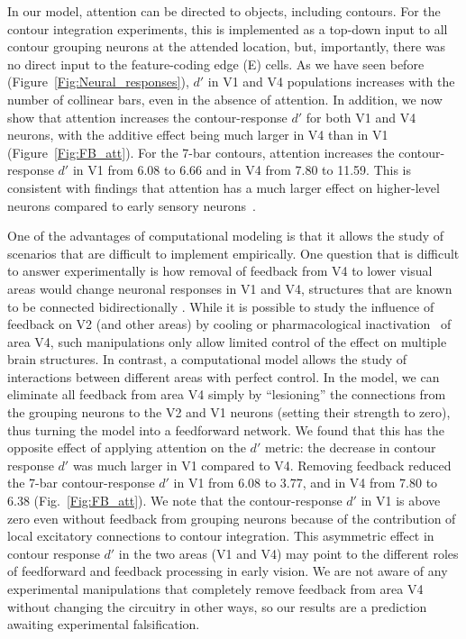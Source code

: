 In our model, attention can be directed to objects, including contours. For the contour integration experiments, this is implemented as a top-down input to all contour grouping neurons at the attended location, but, importantly, 
there was
%
no direct input to the feature-coding edge (E) cells. As we have seen before (Figure~\ref{Fig:Neural_responses}), $d'$ in V1 and V4 populations increases with the number of collinear bars, even in the absence of attention.  In addition, we now show that attention increases the contour-response $d'$ for both V1 and V4 neurons, with
the additive effect being much larger in V4 than in V1 (Figure~\ref{Fig:FB_att}). For the 7-bar contours, attention increases
the contour-response $d'$ in V1 from 6.08 to 6.66 and in V4 from 7.80
to 11.59. This is consistent with findings that attention has a much
larger effect on higher-level neurons compared to early sensory
neurons~\citep[review:][]{Treue01}.

One of the advantages of computational modeling is that it allows the
study of scenarios that are difficult to implement empirically. One question that is difficult to answer experimentally is how removal of
feedback from V4 to lower visual areas would change neuronal responses in V1 and V4, structures that are known to be connected bidirectionally
\citep{Zeki78b,Ungerleider_etal07}. While it is possible to study the influence of feedback on V2 (and other areas) by cooling \citep{Hupe_etal98} or pharmacological inactivation~\citep{Jansen-Amorim_etal12} of area V4, such manipulations only allow limited control of the effect on multiple brain structures. In contrast, a computational model allows the study of interactions between different areas with perfect control. In the model,  we can eliminate all feedback from area V4 simply by ``lesioning'' the connections from the grouping neurons to the V2 and V1 neurons (setting their strength to zero), thus turning the model into a feedforward network.  We found that this has the opposite effect of applying attention on the $d'$ metric: the decrease in contour
response $d'$ was much larger in V1 compared to V4. Removing feedback
reduced the 7-bar contour-response $d'$ in V1 from 6.08 to 3.77, and
in V4 from 7.80 to 6.38 (Fig.~\ref{Fig:FB_att}). We note that the
contour-response $d'$ in V1 is above zero even without feedback from
grouping neurons because of the contribution of local excitatory
connections to contour integration.  This asymmetric effect in contour
response $d'$ in the two areas (V1 and V4) may point to the different
roles of feedforward and feedback processing in early vision. We are
not aware of any experimental manipulations that completely remove
feedback from area V4 without changing the circuitry in other ways, so
our results are a prediction awaiting experimental falsification.

